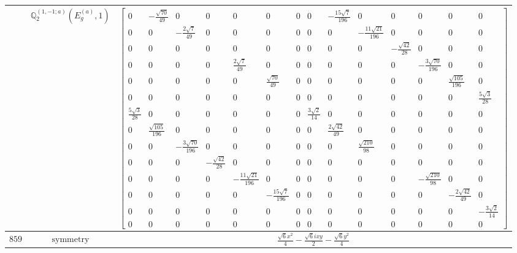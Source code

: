\documentclass[fleqn,8pt,landscape]{jsarticle}
\begin{document}
\begin{longtable}{ccc}
$  $ & $ \mathbb{Q}_{2}^{(1,-1;a)}(E_{g}^{(a)},1) $ & $ \begin{bmatrix} 0 & - \frac{\sqrt{70}}{49} & 0 & 0 & 0 & 0 & 0 & 0 & - \frac{15 \sqrt{7}}{196} & 0 & 0 & 0 & 0 & 0 \\ 0 & 0 & - \frac{2 \sqrt{7}}{49} & 0 & 0 & 0 & 0 & 0 & 0 & - \frac{11 \sqrt{21}}{196} & 0 & 0 & 0 & 0 \\ 0 & 0 & 0 & 0 & 0 & 0 & 0 & 0 & 0 & 0 & - \frac{\sqrt{42}}{28} & 0 & 0 & 0 \\ 0 & 0 & 0 & 0 & \frac{2 \sqrt{7}}{49} & 0 & 0 & 0 & 0 & 0 & 0 & - \frac{3 \sqrt{70}}{196} & 0 & 0 \\ 0 & 0 & 0 & 0 & 0 & \frac{\sqrt{70}}{49} & 0 & 0 & 0 & 0 & 0 & 0 & \frac{\sqrt{105}}{196} & 0 \\ 0 & 0 & 0 & 0 & 0 & 0 & 0 & 0 & 0 & 0 & 0 & 0 & 0 & \frac{5 \sqrt{3}}{28} \\ \frac{5 \sqrt{3}}{28} & 0 & 0 & 0 & 0 & 0 & 0 & \frac{3 \sqrt{2}}{14} & 0 & 0 & 0 & 0 & 0 & 0 \\ 0 & \frac{\sqrt{105}}{196} & 0 & 0 & 0 & 0 & 0 & 0 & \frac{2 \sqrt{42}}{49} & 0 & 0 & 0 & 0 & 0 \\ 0 & 0 & - \frac{3 \sqrt{70}}{196} & 0 & 0 & 0 & 0 & 0 & 0 & \frac{\sqrt{210}}{98} & 0 & 0 & 0 & 0 \\ 0 & 0 & 0 & - \frac{\sqrt{42}}{28} & 0 & 0 & 0 & 0 & 0 & 0 & 0 & 0 & 0 & 0 \\ 0 & 0 & 0 & 0 & - \frac{11 \sqrt{21}}{196} & 0 & 0 & 0 & 0 & 0 & 0 & - \frac{\sqrt{210}}{98} & 0 & 0 \\ 0 & 0 & 0 & 0 & 0 & - \frac{15 \sqrt{7}}{196} & 0 & 0 & 0 & 0 & 0 & 0 & - \frac{2 \sqrt{42}}{49} & 0 \\ 0 & 0 & 0 & 0 & 0 & 0 & 0 & 0 & 0 & 0 & 0 & 0 & 0 & - \frac{3 \sqrt{2}}{14} \\ 0 & 0 & 0 & 0 & 0 & 0 & 0 & 0 & 0 & 0 & 0 & 0 & 0 & 0 \end{bmatrix} $ \\ \hline
$ 859 $ & $ \text{symmetry} $ & $ \frac{\sqrt{6} x^{2}}{4} - \frac{\sqrt{6} i x y}{2} - \frac{\sqrt{6} y^{2}}{4} $ \\

\end{longtable}
\end{document}
